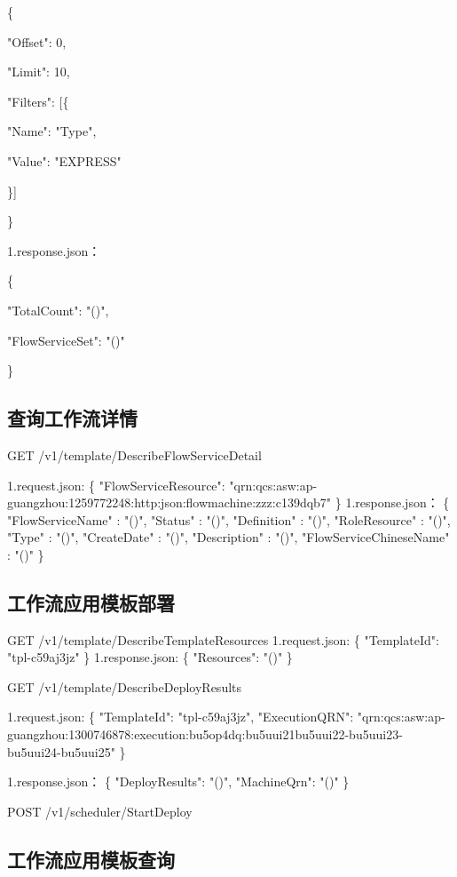 \{

"Offset": 0,

"Limit": 10,

"Filters": [\{

"Name": "Type",

"Value": "EXPRESS"

\}]

\}

1.response.json：

\{

"TotalCount": "\@exists()",

"FlowServiceSet": "\@exists()"

\}

\subsection{查询工作流详情}
GET /v1/template/DescribeFlowServiceDetail


1.request.json:
\{
"FlowServiceResource": "qrn:qcs:asw:ap-guangzhou:1259772248:http:json:flowmachine:zzz:c139dqb7"
\}
1.response.json：
\{
"FlowServiceName"        :  "\@notEmpty()",
"Status"                 :  "\@notEmpty()",
"Definition"             :  "\@notEmpty()",
"RoleResource"           :  "\@notEmpty()",
"Type"                   :  "\@notEmpty()",
"CreateDate"             :  "\@notEmpty()",
"Description"            :  "\@notEmpty()",
"FlowServiceChineseName" :  "\@exists()"
\}

\subsection{工作流应用模板部署}
GET /v1/template/DescribeTemplateResources
1.request.json:
\{
"TemplateId": "tpl-c59aj3jz"
\}
1.response.json:
\{
"Resources": "\@exists()"
\}

GET /v1/template/DescribeDeployResults

1.request.json:
\{
"TemplateId": "tpl-c59aj3jz",
"ExecutionQRN": "qrn:qcs:asw:ap-guangzhou:1300746878:execution:bu5op4dq:bu5uui21bu5uui22-bu5uui23-bu5uui24-bu5uui25"
\}

1.response.json：
\{
"DeployResults": "\@exists()",
"MachineQrn": "\@len()"
\}

POST /v1/scheduler/StartDeploy

\subsection{工作流应用模板查询}

